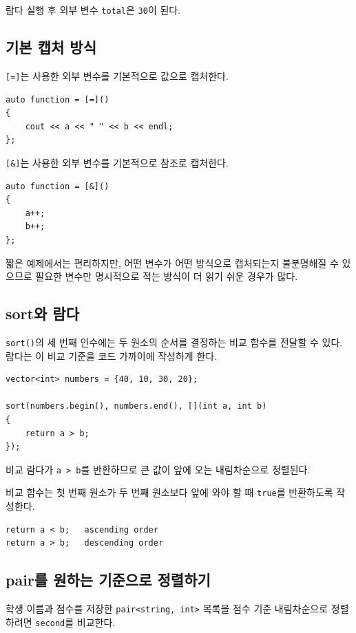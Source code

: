 \documentclass[11pt,a4paper]{article}
\begin{document}
람다 실행 후 외부 변수 \texttt{total}은 \texttt{30}이 된다.

\subsection{기본 캡처 방식}
\texttt{[=]}는 사용한 외부 변수를 기본적으로 값으로 캡처한다.

\begin{lstlisting}
auto function = [=]()
{
    cout << a << " " << b << endl;
};
\end{lstlisting}

\texttt{[\&]}는 사용한 외부 변수를 기본적으로 참조로 캡처한다.

\begin{lstlisting}
auto function = [&]()
{
    a++;
    b++;
};
\end{lstlisting}

짧은 예제에서는 편리하지만, 어떤 변수가 어떤 방식으로 캡처되는지 불분명해질 수 있으므로 필요한 변수만 명시적으로 적는 방식이 더 읽기 쉬운 경우가 많다.

\subsection{sort와 람다}
\texttt{sort()}의 세 번째 인수에는 두 원소의 순서를 결정하는 비교 함수를 전달할 수 있다. 람다는 이 비교 기준을 코드 가까이에 작성하게 한다.

\begin{lstlisting}
vector<int> numbers = {40, 10, 30, 20};

sort(numbers.begin(), numbers.end(), [](int a, int b)
{
    return a > b;
});
\end{lstlisting}

비교 람다가 \texttt{a > b}를 반환하므로 큰 값이 앞에 오는 내림차순으로 정렬된다.

비교 함수는 첫 번째 원소가 두 번째 원소보다 앞에 와야 할 때 \texttt{true}를 반환하도록 작성한다.

\begin{verbatim}
return a < b;   ascending order
return a > b;   descending order
\end{verbatim}

\subsection{pair를 원하는 기준으로 정렬하기}
학생 이름과 점수를 저장한 \texttt{pair<string, int>} 목록을 점수 기준 내림차순으로 정렬하려면 \texttt{second}를 비교한다.
\end{document}
